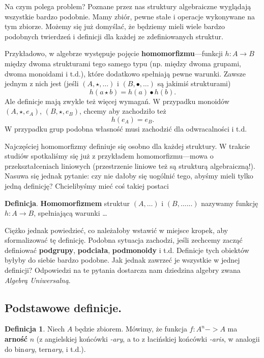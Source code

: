 \documentclass{article}
\theoremstyle{definition}
\newtheorem{definition}{Definicja}[section]
\begin{document}
Na czym polega problem?
Poznane przez nas struktury algebraiczne wyglądają wszystkie bardzo podobnie.
Mamy zbiór, pewne stałe i operacje wykonywane na tym zbiorze.
Możemy się już domyślać,
że będziemy mieli wiele bardzo podobnych twierdzeń i definicji dla każdej ze zdefiniowanych struktur.

Przykładowo,
w algebrze występuje pojęcie \textbf{homomorfizmu}---funkcji $h: A \to B$ między dwoma strukturami tego samego typu (np. między dwoma grupami, dwoma monoidami i t.d.),
które dodatkowo spełniają pewne warunki.
Zawsze jednym z nich jest (jeśli $(A, \star, \dots)$ i $(B, \bullet, \dots)$ są jakimiś strukturami)
\begin{equation}
	h(a\star b) = h(a) \bullet h(b).
\end{equation}
Ale definicje mają zwykle też więcej wymagań.
W przypadku monoidów $(A, \star, e_A)$, $(B, \star, e_B)$,
chcemy aby zachodziło też
\begin{equation}
	h(e_A) = e_B.
\end{equation}
W przypadku grup podobna własność musi zachodzić dla odwracalności i t.d.

Najczęściej homomorfizmy definiuje się osobno dla każdej struktury.
W trakcie studiów spotkaliśmy się już z przykładem homomorfizmu---mowa o przekształceniach liniowych (przestrzenie liniowe też są strukturą algebraiczną!).
Nasuwa się jednak pytanie: czy nie dałoby się uogólnić tego, abyśmy mieli tylko jedną definicję? Chcielibyśmy mieć coś takiej postaci

\noindent \textbf{Definicja}. \textbf{Homomorfizmem} struktur $(A, \dots)$ i $(B, \dots...)$ nazywamy funkcję $h: A \to B$, spełniającą warunki \dots

Ciężko jednak powiedzieć, co należałoby wstawić w miejsce kropek, aby sformalizować tę definicję.
Podobna sytuacja zachodzi,
    jeśli zechcemy zacząć definiować \textbf{podgrupy}, \textbf{podciała}, \textbf{podmonoidy} i t.d.
Definicje tych obiektów byłyby do siebie bardzo podobne.
Jak jednak zawrzeć je wszystkie w jednej definicji?
Odpowiedzi na te pytania dostarcza nam dziedzina algebry zwana \textit{Algebrą Uniwersalną}.

\subsection{Podstawowe definicje.}

\begin{definition}
	Niech $A$ będzie zbiorem.
	Mówimy, że funkcja $f: A^n -> A$ ma \textbf{arność} $n$ (z angielskiej końcówki \textit{-ary}, a to z łacińskiej końcówki \textit{-aris}, w analogii do bin\textit{ary}, tern\textit{ary}, i t.d.).
\end{definition}
\end{document}
